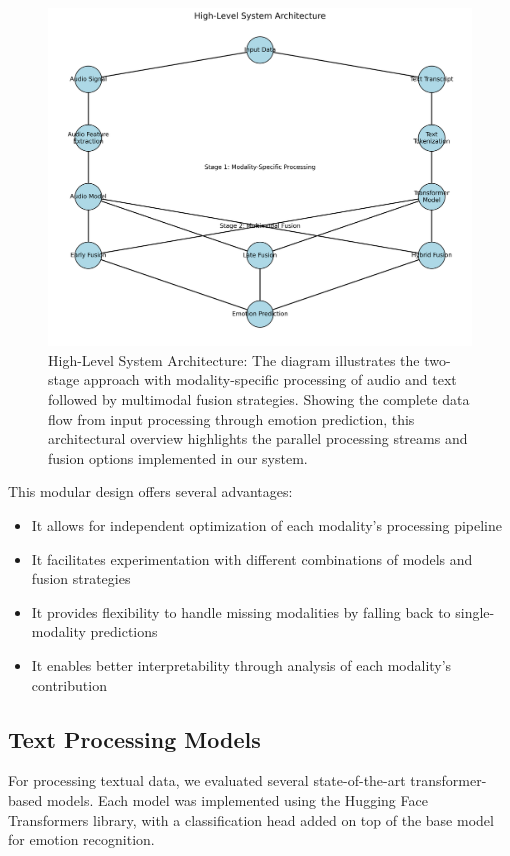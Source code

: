 \documentclass[12pt]{article}
\begin{document}
\begin{figure}[h]
    \centering
    \includegraphics[width=0.9\linewidth]{Figures/system_architecture_fixed.png}
    \caption{High-Level System Architecture: The diagram illustrates the two-stage approach with modality-specific processing of audio and text followed by multimodal fusion strategies. Showing the complete data flow from input processing through emotion prediction, this architectural overview highlights the parallel processing streams and fusion options implemented in our system.}
    \label{fig:system_architecture}
\end{figure}

This modular design offers several advantages:
\begin{itemize}
    \item It allows for independent optimization of each modality's processing pipeline
    \item It facilitates experimentation with different combinations of models and fusion strategies
    \item It provides flexibility to handle missing modalities by falling back to single-modality predictions
    \item It enables better interpretability through analysis of each modality's contribution
\end{itemize}

\subsection{Text Processing Models}
For processing textual data, we evaluated several state-of-the-art transformer-based models. Each model was implemented using the Hugging Face Transformers library, with a classification head added on top of the base model for emotion recognition.
\end{document}
